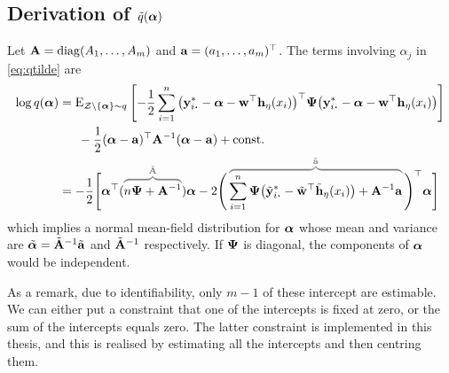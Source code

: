 \subsection{Derivation of \texorpdfstring{$\tilde q({\bm\alpha})$}{$\tilde q(\alpha)$}}

Let ${\mathbf A} = \operatorname{diag}(A_1,\dots,A_m)$ and ${\mathbf a} = (a_1,\dots,a_m)^\top$.
The terms involving $\alpha_j$ in \cref{eq:qtilde} are
\begin{align*}
  \log q(\balpha)
  &= \E_{\cZ\backslash\{\balpha\}\sim q} \left[ 
  -\half\sum_{i=1}^n 
  \big(\by^*_{i \bigcdot} - \balpha - \bw^\top\bh_\eta(x_i)\big)^\top 
  \bPsi \big(\by^*_{i \bigcdot} - \balpha - \bw^\top\bh_\eta(x_i)\big)
  \right] \\
  &\phantom{==}
  - \half (\balpha - \ba)^\top \bA^{-1} (\balpha - \ba) + \const \\
  &= -\half \Bigg[ \balpha^\top(
  \greyoverbrace{n\bPsi + \bA^{-1}}{\tilde \bA}
  )\balpha -2\Bigg( \, 
   \greyoverbrace{\sum_{i=1}^n \bPsi\big( \tilde\by^*_{i \bigcdot} - \tilde\bw^\top\tilde\bh_\eta(x_i) \big) + \bA^{-1} \ba}{\tilde \ba} 
  \, \Bigg)^\top \balpha \Bigg]
\end{align*}
which implies a normal mean-field distribution for ${\bm\alpha}$ whose mean and variance are $\tilde{{\bm\alpha}} = \tilde {{\mathbf A}}^{-1}\tilde {{\mathbf a}}$ and $\tilde {{\mathbf A}}^{-1}$ respectively.
If ${\bm\Psi}$ is diagonal, the components of ${\bm\alpha}$ would be independent.

As a remark, due to identifiability, only $m-1$ of these intercept are estimable.
We can either put a constraint that one of the intercepts is fixed at zero, or the sum of the intercepts equals zero.
The latter constraint is implemented in this thesis, and this is realised by estimating all the intercepts and then centring them.

